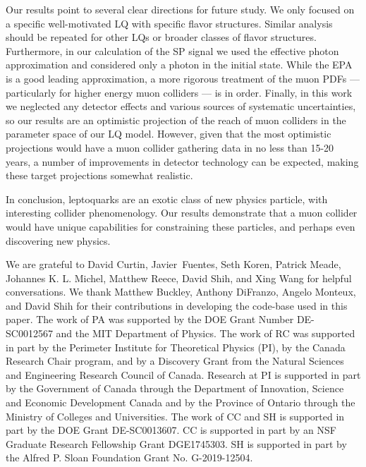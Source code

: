 \documentclass[a4paper,11pt]{article}
\begin{document}
Our results point to several clear directions for future study. 
We only focused on a specific well-motivated LQ with specific flavor structures. 
Similar analysis should be repeated for other LQs or broader classes of flavor structures. 
Furthermore, in our calculation of the SP signal we used the effective photon approximation and considered only a photon in the initial state. 
While the EPA is a good leading approximation, a more rigorous treatment of the muon PDFs --- particularly for higher energy muon colliders --- is in order. 
Finally, in this work we neglected any detector effects and various sources of systematic uncertainties, so our results are an optimistic projection of the reach of muon colliders in the parameter space of our LQ model.  
However, given that the most optimistic projections would have a muon collider gathering data in no less than 15-20 years, a number of improvements in detector technology can be expected, making these target projections somewhat realistic.


In conclusion, leptoquarks are an exotic class of new physics particle, with interesting collider phenomenology. Our results demonstrate that a muon collider would have unique capabilities for constraining these particles, and perhaps even discovering new physics.





\acknowledgments

We are grateful to David Curtin, Javier Fuentes, Seth Koren, Patrick Meade, Johannes K. L. Michel, Matthew Reece, David Shih, and Xing Wang for helpful conversations. We thank Matthew Buckley, Anthony DiFranzo, Angelo Monteux, and David Shih for their contributions in developing the code-base used in this paper. The work of PA was supported by the DOE Grant Number DE-SC0012567 and the MIT Department of Physics. 
The work of RC was supported in part by the Perimeter Institute for Theoretical Physics (PI), by the Canada Research Chair program, and by a Discovery Grant from the Natural Sciences and Engineering Research Council of Canada. Research at PI is supported in part by the Government of Canada through the Department of Innovation, Science and Economic Development Canada and by the Province of Ontario through the Ministry of Colleges and Universities.
The work of CC and SH is supported in part by the DOE Grant DE-SC0013607. CC is supported in part by an NSF Graduate Research Fellowship Grant DGE1745303. SH is supported in part by the Alfred P. Sloan Foundation Grant No. G-2019-12504.
\end{document}
